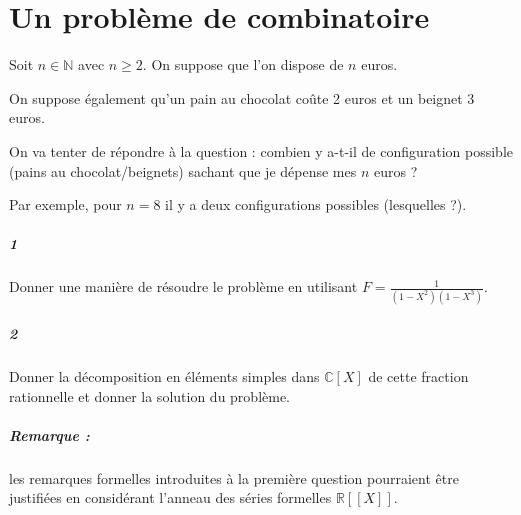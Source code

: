\documentclass[10pt,a4paper]{article}
\begin{document}
\section{Un problème de combinatoire}
Soit $n \in \mathbb{N}$ avec $n \ge 2$. On suppose que l'on dispose de $n$ euros. 

On suppose également qu'un pain au chocolat coûte 2 euros et un beignet 3 euros.

On va tenter de répondre à la question : combien y a-t-il de configuration possible (pains au chocolat/beignets) sachant que je dépense mes $n$ euros ?

Par exemple, pour $n=8$ il y a deux configurations possibles (lesquelles ?).
\subparagraph{1} Donner une manière de résoudre le problème en utilisant $F= \frac{1}{(1-X^2)(1-X^3)}$.
\subparagraph{2}Donner la décomposition en éléments simples dans $\mathbb{C}[X]$ de cette fraction rationnelle et donner la solution du problème.

\subparagraph{Remarque : } les remarques formelles introduites à la première question pourraient être justifiées en considérant l'anneau des séries formelles $\mathbb{R}[[X]]$.
\end{document}
